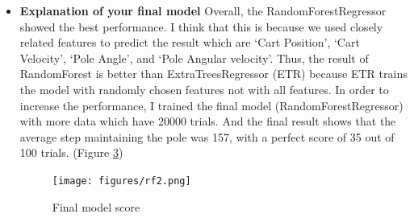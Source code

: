 \documentclass[12pt]{article}
\begin{document}
\begin{itemize}
\begin{enumerate}
      \item AdaBoostRegressor. The result was terrable. Because in the case of AdaBoost it modifies the weights sequencially with the wrongly predicted data set. Since our data set consists of randomly chosen episodes, the AdaBoost model might be inappropriate to train the this data. (Figure \ref{AdaBoost})
      \begin{figure}[H]
        \centering
        \texttt{[image: figures/AdaBoost.png]}
        \caption{AdaBoostRegressor}\label{AdaBoost}
      \end{figure}

      \item ExtraTreesRegressor. It showed the relatively good result. The average step maintaining the pole was 138, with a perfect score of 17 out of 100 trials. (Figure \ref{etr})
      \begin{figure}[H]
        \centering
        \texttt{[image: figures/random\_forest.png]}
        \caption{ExtraTreesRegressor}\label{etr}
      \end{figure}
    \end{enumerate}

\item \textbf{Explanation of your final model}
Overall, the RandomForestRegressor showed the best performance. I think that this is because we used closely related features to predict the result which are `Cart Position', `Cart Velocity', `Pole Angle', and `Pole Angular velocity'. Thus, the result of RandomForest is better than ExtraTreesRegressor (ETR) because ETR trains the model with randomly chosen features not with all features. In order to increase the performance, I trained the final model (RandomForestRegressor) with more data which have 20000 trials. And the final result shows that the average step maintaining the pole was 157, with a perfect score of 35 out of 100 trials. (Figure \ref{rf2})

\begin{figure}[H]
  \centering
  \texttt{[image: figures/rf2.png]}
  \caption{Final model score}\label{rf2}
\end{figure}


\end{itemize}
\end{document}
